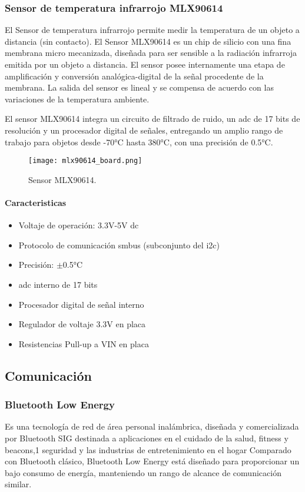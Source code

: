 \subsubsection{Sensor de temperatura infrarrojo MLX90614}
El Sensor de temperatura infrarrojo permite medir la temperatura de un objeto a distancia (sin contacto).
El Sensor MLX90614 es un chip de silicio con una fina membrana micro mecanizada, diseñada para ser sensible
a la radiación infrarroja emitida por un objeto a distancia. El sensor posee internamente una etapa de
amplificación y conversión analógica-digital de la señal procedente de la membrana. La salida del sensor es lineal
y se compensa de acuerdo con las variaciones de la temperatura ambiente.

El sensor MLX90614 integra un circuito de filtrado de ruido, un \acrshort{adc} de 17 bits de resolución
y un procesador digital de señales, entregando un amplio rango de trabajo para objetos desde -70°C hasta
380°C, con una precisión de 0.5°C.

\begin{figure}[htp!]
    \centering
    \texttt{[image: mlx90614\_board.png]}
    \caption{Sensor MLX90614.}
    \label{fig: sensor}
\end{figure}\FloatBarrier

\paragraph{Caracteristicas}
\begin{itemize}
    \item Voltaje de operación: 3.3V-5V \acrshort{dc}
    \item Protocolo de comunicación \acrshort{smbus} (subconjunto del \acrshort{i2c})
    \item Precisión: $ \pm $0.5°C
    \item \acrshort{adc} interno de 17 bits
    \item Procesador digital de señal interno
    \item Regulador de voltaje 3.3V en placa
    \item Resistencias Pull-up a VIN en placa
\end{itemize}

\subsection{Comunicación}
    \subsubsection{Bluetooth Low Energy}
    Es una tecnología de red de área personal inalámbrica, diseñada y comercializada por Bluetooth SIG
    destinada a aplicaciones en el cuidado de la salud, fitness y beacons,1 seguridad y las industrias
    de entretenimiento en el hogar Comparado con Bluetooth clásico, Bluetooth Low Energy está diseñado
    para proporcionar un bajo consumo de energía, manteniendo un rango de alcance de comunicación similar.

